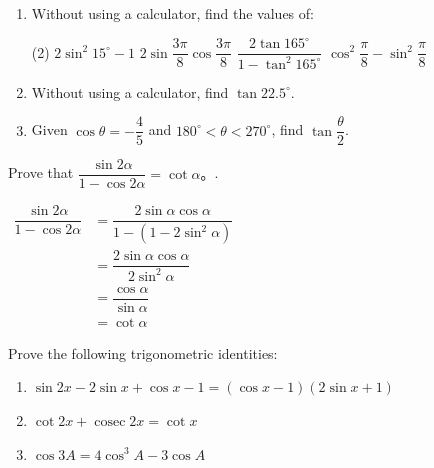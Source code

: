 \documentclass{report}
\begin{document}
\begin{enumerate}
	\item Without using a calculator, find the values of:
	      \begin{tasks}[label=(\alph*)](2)
	      	\task $2 \sin ^2 15^{\circ}-1$
	      	\task $2 \sin \dfrac{3 \pi}{8} \cos \dfrac{3 \pi}{8}$
	      	\task $\dfrac{2 \tan 165^{\circ}}{1-\tan ^2 165^{\circ}}$
	      	\task $\cos ^2 \dfrac{\pi}{8}-\sin ^2 \dfrac{\pi}{8}$
	      \end{tasks}
	\item Without using a calculator, find $\tan 22.5^{\circ}$.
	\item Given $\cos \theta=-\dfrac{4}{5}$ and $180^{\circ}<\theta<270^{\circ}$, find $\tan \dfrac{\theta}{2}$.
\end{enumerate}

\begin{question}
	Prove that $\dfrac{\sin 2 \alpha}{1-\cos 2 \alpha}=\cot \alpha 。$.
	
	\proof{}
	    
	\noindent $\begin{aligned} \dfrac{\sin 2 \alpha}{1-\cos 2 \alpha} & =\dfrac{2 \sin \alpha \cos \alpha}{1-\left(1-2 \sin ^2 \alpha\right)} \\ & =\dfrac{2 \sin \alpha \cos \alpha}{2 \sin ^2 \alpha} \\ & =\dfrac{\cos \alpha}{\sin \alpha} \\ & =\cot \alpha\end{aligned}$
\end{question}


Prove the following trigonometric identities:
\begin{enumerate}
	\item $\sin 2 x-2 \sin x+\cos x-1=(\cos x-1)(2 \sin x+1)$
	\item $\cot 2 x+\operatorname{cosec} 2 x=\cot x$
	\item $\cos 3 A=4 \cos ^3 A-3 \cos A$
\end{enumerate}

\newpage
{}
\end{document}
